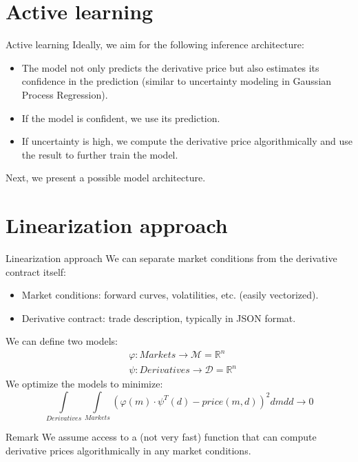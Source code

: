 \documentclass[10pt]{beamer}
\newcommand{\R}{\ensuremath{\mathbb{R}}}
\renewcommand{\phi}{\varphi}
\begin{document}
    \section{Active learning}
    \begin{frame}{Active learning}
        Ideally, we aim for the following inference architecture:
        \begin{itemize}
            \item The model not only predicts the derivative price but also estimates its confidence in the prediction (similar to uncertainty modeling in Gaussian Process Regression).
            \item If the model is confident, we use its prediction.
            \item If uncertainty is high, we compute the derivative price algorithmically and use the result to further train the model.
        \end{itemize}
        Next, we present a possible model architecture.
    \end{frame}

    \section{Linearization approach}
    \begin{frame}{Linearization approach}
        We can separate market conditions from the derivative contract itself:
        \begin{itemize}
            \item Market conditions: forward curves, volatilities, etc. (easily vectorized).
            \item Derivative contract: trade description, typically in JSON format.
        \end{itemize}

        We can define two models:
        \begin{align*}
            & \phi: Markets \to \mathcal{M} = \R^n \\
            & \psi: Derivatives \to \mathcal{D} = \R^n
        \end{align*}
        We optimize the models to minimize:
        \[
            \int\limits_{Derivatives}\int\limits_{Markets}\left( \phi(m) \cdot \psi^T(d) - price(m, d) \right)^2 dm dd \to 0
        \]

        \begin{block}{Remark}
            We assume access to a (not very fast) function that can compute derivative prices algorithmically in any market conditions.
        \end{block}
    \end{frame}
\end{document}

